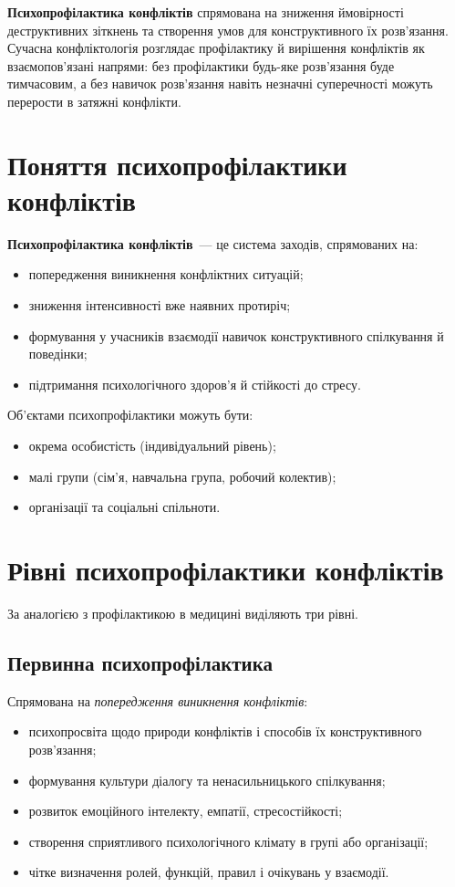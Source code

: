 \documentclass[12pt,a4paper]{article}
\begin{document}
    \textbf{Психопрофілактика конфліктів} спрямована на зниження ймовірності деструктивних зіткнень 
    та створення умов для конструктивного їх розв’язання. 
    Сучасна конфліктологія розглядає профілактику й вирішення конфліктів як взаємопов’язані напрями: 
    без профілактики будь-яке розв’язання буде тимчасовим, а без навичок розв’язання навіть незначні 
    суперечності можуть перерости в затяжні конфлікти.

    \section*{Поняття психопрофілактики конфліктів}
    \textbf{Психопрофілактика конфліктів}~--- це система заходів, спрямованих на:
    \begin{itemize}
        \item попередження виникнення конфліктних ситуацій;
        \item зниження інтенсивності вже наявних протиріч;
        \item формування у учасників взаємодії навичок конструктивного спілкування й поведінки;
        \item підтримання психологічного здоров’я й стійкості до стресу.
    \end{itemize}

    Об’єктами психопрофілактики можуть бути:
    \begin{itemize}
        \item окрема особистість (індивідуальний рівень);
        \item малі групи (сім’я, навчальна група, робочий колектив);
        \item організації та соціальні спільноти.
    \end{itemize}

    \section*{Рівні психопрофілактики конфліктів}
    За аналогією з профілактикою в медицині виділяють три рівні.

    \subsection*{Первинна психопрофілактика}
    Спрямована на \textit{попередження виникнення конфліктів}:
    \begin{itemize}
        \item психопросвіта щодо природи конфліктів і способів їх конструктивного розв’язання;
        \item формування культури діалогу та ненасильницького спілкування;
        \item розвиток емоційного інтелекту, емпатії, стресостійкості;
        \item створення сприятливого психологічного клімату в групі або організації;
        \item чітке визначення ролей, функцій, правил і очікувань у взаємодії.
    \end{itemize}
\end{document}
